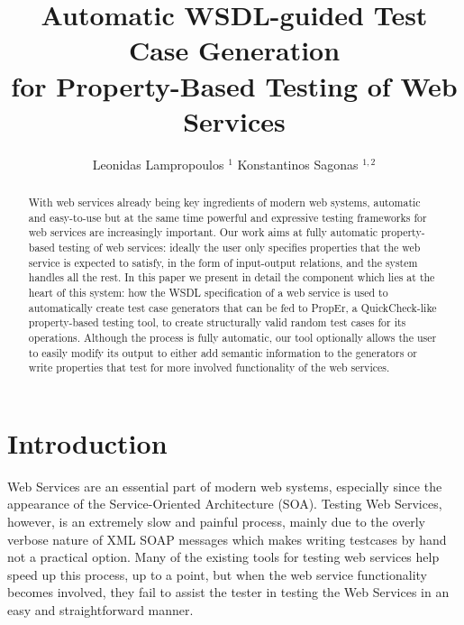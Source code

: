 \documentclass[submission,copyright]{eptcs}
\title{Automatic WSDL-guided Test Case Generation\\
       for Property-Based Testing of Web Services}
\author{Leonidas Lampropoulos $^{1}$ \hspace*{1em} Konstantinos Sagonas $^{1,2}$
\institute{%
  $^{1}$ School of Electrical and Computer Engineering,
  National Technical University of Athens, Greece\\
  $^{2}$ Department of Information Technology, Uppsala University, Sweden
}
}
\begin{document}
\maketitle

\begin{abstract}
With web services already being key ingredients of modern web systems,
automatic and easy-to-use but at the same time powerful and expressive
testing frameworks for web services are increasingly important. Our
work aims at fully automatic property-based testing of web services:
ideally the user only specifies properties that the web service is
expected to satisfy, in the form of input-output relations, and the
system handles all the rest. In this paper we present in detail the
component which lies at the heart of this system: how the WSDL
specification of a web service is used to automatically create test
case generators that can be fed to PropEr, a QuickCheck-like
property-based testing tool, to create structurally valid random
test cases for its operations. Although the process is fully automatic,
our tool optionally allows the user to easily modify its output to
either add semantic information to the generators or write properties
that test for more involved functionality of the web services.
\end{abstract}


\section{Introduction} \label{sec:intro}


Web Services are an essential part of modern web systems, especially
since the appearance of the Service-Oriented Architecture (SOA).
Testing Web Services, however, is an extremely slow and painful
process, mainly due to the overly verbose nature of XML SOAP messages
which makes writing testcases by hand not a practical option. Many of
the existing tools for testing web services help speed up this
process, up to a point, but when the web service functionality becomes
involved, they fail to assist the tester in testing the Web Services
in an easy and straightforward manner.

\end{document}
